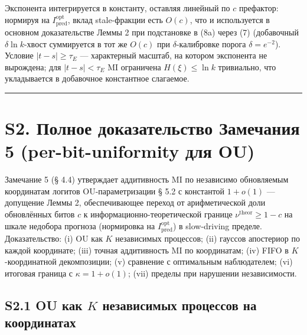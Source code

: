 \documentclass[pdflatex,sn-mathphys-ay]{sn-jnl}
\begin{document}
Экспонента интегрируется в константу, оставляя линейный по \(c\) префактор: нормируя на \(I_{\text{pred}}^{\text{opt}}\), вклад stale-фракции есть \(O(c)\), что и используется в основном доказательстве Леммы 2 при подстановке в (8a) через (7) (добавочный \(\delta\ln k\)-хвост суммируется в тот же \(O(c)\) при \(\delta\)-калибровке порога \(\delta = e^{-2}\)). Условие \(|t-s| \ge \tau_E\) --- характерный масштаб, на котором экспонента не вырождена; для \(|t-s| < \tau_E\) MI ограничена \(H(\xi) \le \ln k\) тривиально, что укладывается в добавочное константное слагаемое.



\begin{center}\rule{0.5\linewidth}{0.5pt}\end{center}



\section*{S2. Полное доказательство Замечания 5 (per-bit-uniformity для OU)}\label{s2.-ux43fux43eux43bux43dux43eux435-ux434ux43eux43aux430ux437ux430ux442ux435ux43bux44cux441ux442ux432ux43e-ux437ux430ux43cux435ux447ux430ux43dux438ux44f-5-per-bit-uniformity-ux434ux43bux44f-ou}



Замечание 5 (§ 4.4) утверждает аддитивность MI по независимо обновляемым координатам логитов OU-параметризации § 5.2 с константой \(1 + o(1)\) --- допущение Леммы 2, обеспечивающее переход от арифметической доли обновлённых битов \(c\) к информационно-теоретической границе \(\nu^{\text{theor}} \ge 1 - c\) на шкале недобора прогноза (нормировка на \(I_{\text{pred}}^{\text{opt}}\)) в slow-driving пределе. Доказательство: (i) OU как \(K\) независимых процессов; (ii) гауссов апостериор по каждой координате; (iii) точная аддитивность MI по координатам; (iv) FIFO в \(K\)-координатной декомпозиции; (v) сравнение с оптимальным наблюдателем; (vi) итоговая граница с \(\kappa = 1 + o(1)\); (vii) пределы при нарушении независимости.



\subsection*{\texorpdfstring{S2.1 OU как \(K\) независимых процессов на координатах}{S2.1 OU как K независимых процессов на координатах}}\label{s2.1-ou-ux43aux430ux43a-k-ux43dux435ux437ux430ux432ux438ux441ux438ux43cux44bux445-ux43fux440ux43eux446ux435ux441ux441ux43eux432-ux43dux430-ux43aux43eux43eux440ux434ux438ux43dux430ux442ux430ux445}
\end{document}
